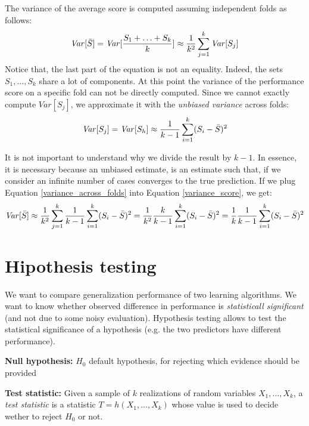 The variance of the average score is computed assuming independent folds as follows:
\begin{equation}
    \label{variance_score}
    \mathit{Var}[\Bar{S}] = \mathit{Var}[\frac{S_1+\hdots+S_k}{k}] \approx \frac{1}{k^2} \sum_{j=1}^k \mathit{Var}[S_j]
\end{equation}
Notice that, the last part of the equation is not an equality. Indeed, the sets $S_1, \hdots, S_k$ share a lot of components. At this point the variance of the performance score on a specific fold can not be directly computed. Since we cannot exactly compute $\mathit{Var}[S_j]$, we approximate it with the \textit{unbiased variance} across folds:
\begin{equation}
    \label{variance_across_folds}
    \mathit{Var}[S_j] = \mathit{Var}[S_h] \approx \frac{1}{k-1} \sum_{i=1}^k(S_i - \Bar{S})^2
\end{equation}

It is not important to understand why we divide the result by $k-1$. In essence, it is necessary because an unbiased estimate, is an estimate such that, if we consider an infinite number of cases converges to the true prediction. If we plug Equation \ref{variance_across_folds} into Equation \ref{variance_score}, we get:
\begin{equation}
    \mathit{Var}[\Bar{S}] \approx \frac{1}{k^2} \sum_{j=1}^k \frac{1}{k-1} \sum_{i=1}^k(S_i - \Bar{S})^2 = \frac{1}{k^2} \frac{k}{k-1} \sum_{i=1}^k(S_i - \Bar{S})^2 = \frac{1}{k} \frac{1}{k-1} \sum_{i=1}^k(S_i - \Bar{S})^2
\end{equation}

\section{Hipothesis testing}
We want to compare generalization performance of two learning algorithms. We want to know whether observed difference in performance is \textit{statisticall significant} (and not due to some noisy evaluation). Hypothesis testing allows to test the statistical significance of a hypothesis (e.g. the two predictors have different performance). \newline

\textbf{Null hypothesis:} $H_0$ default hypothesis, for rejecting which evidence should be provided \newline

\textbf{Test statistic:} Given a sample of $k$ realizations of random variables $X_1, \hdots, X_k$, a \textit{test statistic} is a statistic $T=h(X_1, \hdots ,X_k)$ whose value is used to decide wether to reject $H_0$ or not. \newline

